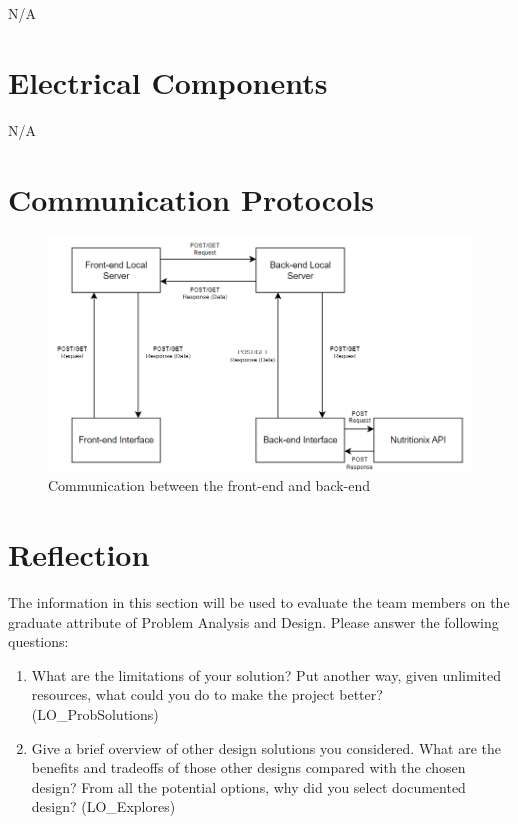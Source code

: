 \documentclass[12pt, titlepage]{article}
\begin{document}
N/A

\section{Electrical Components}

N/A

\section{Communication Protocols}

\begin{figure}[H]
	\centering
	\includegraphics[scale=0.85]{Communication_Protocols.png}
	\caption{Communication between the front-end and back-end}
\end{figure}

\section{Reflection}

The information in this section will be used to evaluate the team members on the
graduate attribute of Problem Analysis and Design.  Please answer the following questions:

\begin{enumerate}
  \item What are the limitations of your solution?  Put another way, given
  unlimited resources, what could you do to make the project better? (LO\_ProbSolutions)
  \item Give a brief overview of other design solutions you considered.  What
  are the benefits and tradeoffs of those other designs compared with the chosen
  design?  From all the potential options, why did you select documented design?
  (LO\_Explores)
\end{enumerate}
\end{document}

